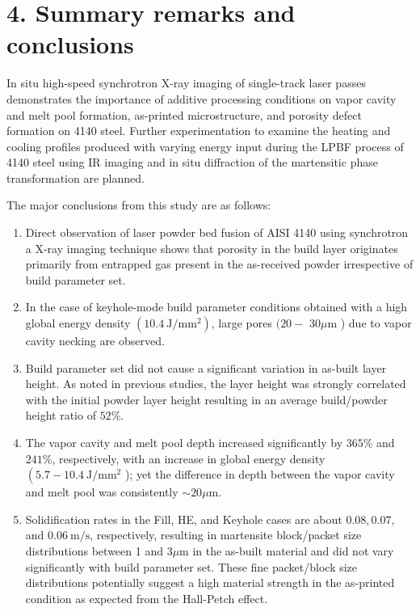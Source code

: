 \documentclass[10pt]{article}
\begin{document}
\section*{4. Summary remarks and conclusions}
In situ high-speed synchrotron X-ray imaging of single-track laser passes demonstrates the importance of additive processing conditions on vapor cavity and melt pool formation, as-printed microstructure, and porosity defect formation on 4140 steel. Further experimentation to examine the heating and cooling profiles produced with varying energy input during the LPBF process of 4140 steel using IR imaging and in situ diffraction of the martensitic phase transformation are planned.

The major conclusions from this study are as follows:

\begin{enumerate}
  \item Direct observation of laser powder bed fusion of AISI 4140 using synchrotron a X-ray imaging technique shows that porosity in the build layer originates primarily from entrapped gas present in the as-received powder irrespective of build parameter set.

  \item In the case of keyhole-mode build parameter conditions obtained with a high global energy density $\left(10.4 \mathrm{~J} / \mathrm{mm}^{2}\right)$, large pores $(20-$ $30 \mu \mathrm{m}$ ) due to vapor cavity necking are observed.

  \item Build parameter set did not cause a significant variation in as-built layer height. As noted in previous studies, the layer height was strongly correlated with the initial powder layer height resulting in an average build/powder height ratio of $52 \%$.

  \item The vapor cavity and melt pool depth increased significantly by $365 \%$ and $241 \%$, respectively, with an increase in global energy density $\left(5.7-10.4 \mathrm{~J} / \mathrm{mm}^{2}\right.$ ); yet the difference in depth between the vapor cavity and melt pool was consistently $\sim 20 \mu \mathrm{m}$.

  \item Solidification rates in the Fill, HE, and Keyhole cases are about $0.08,0.07$, and $0.06 \mathrm{~m} / \mathrm{s}$, respectively, resulting in martensite block/packet size distributions between 1 and $3 \mu \mathrm{m}$ in the as-built material and did not vary significantly with build parameter set. These fine packet/block size distributions potentially suggest a high material strength in the as-printed condition as expected from the Hall-Petch effect.

\end{enumerate}
\end{document}
